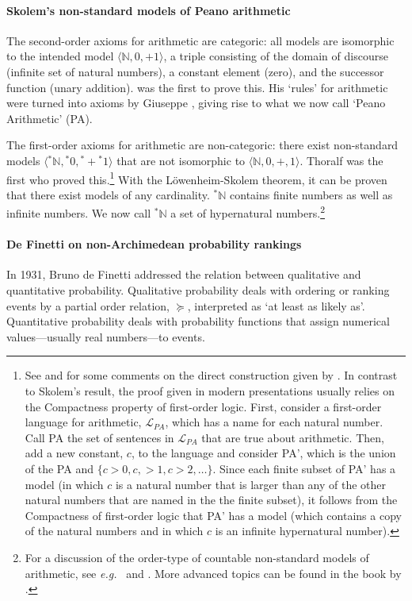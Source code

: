 \paragraph{Skolem's non-standard models of Peano arithmetic}\label{sec:skolem}
The second-order axioms for arithmetic are categoric: all models are isomorphic to the intended model $\langle \mathbb{N},0,+1 \rangle$, a triple consisting of the domain of discourse (infinite set of natural numbers), a constant element (zero), and the successor function (unary addition).
\citet{Dedekind:1888} was the first to prove this. His `rules' for arithmetic were turned into axioms by Giuseppe \citet{Peano:1889}, giving rise to what we now call `Peano Arithmetic' (PA).

The first-order axioms for arithmetic are non-categoric: there exist non-standard models $\langle {^\ast\mathbb{N}},{^\ast0},{^\ast+}{^\ast1} \rangle$ that are not isomorphic to $\langle \mathbb{N},0,+,1 \rangle$. Thoralf \citet{Skolem:1934} was the first who proved this.\footnote{See \citet[section~3]{Stillwell:1977} and \citet[section~3.2]{Kanovei_etal:2013} for some comments on the direct construction given by \citet{Skolem:1934}. In contrast to Skolem's result, the proof given in modern presentations usually relies on the Compactness property of first-order logic. First, consider a first-order language for arithmetic, $\mathcal{L}_{PA}$, which has a name for each natural number. Call PA the set of sentences in $\mathcal{L}_{PA}$ that are true about arithmetic. Then, add a new constant, $c$, to the language and consider PA', which is the union of the PA and $\{c>0,c,>1,c>2, \ldots\}$. Since each finite subset of PA' has a model (in which $c$ is a natural number that is larger than any of the other natural numbers that are named in the the finite subset), it follows from the Compactness of first-order logic that PA' has a model (which contains a copy of the natural numbers and in which $c$ is an infinite hypernatural number).\label{fn:Skolem}} With the L\"{o}wenheim-Skolem theorem, it can be proven that there exist models of any cardinality. ${^\ast\mathbb{N}}$ contains finite numbers as well as infinite numbers. We now call ${^\ast\mathbb{N}}$ a set of hypernatural numbers.\footnote{For a discussion of the order-type of countable non-standard models of arithmetic, see \textit{e.g.}\ \citet[Ch.~25, p.~302--318]{Boolos_etal:2007} and \citet{McGee:2002}. More advanced topics can be found in the book by \citet{KossakSchmerl:2006}.}

\paragraph{De Finetti on non-Archimedean probability rankings\label{sec:dF}}
In 1931, Bru\-no de Finetti addressed the relation between qualitative and quantitative probability. Qualitative probability deals with ordering or ranking events by a partial order relation, $\succeq$, interpreted as `at least as likely as'. Quantitative probability deals with probability functions that assign numerical values---usually real numbers---to events.

